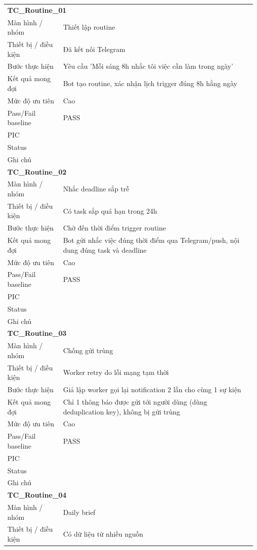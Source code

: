 \documentclass[12pt,a4paper]{article}
\begin{document}
\begin{longtable}{p{3.0cm}p{11.5cm}}
\multicolumn{2}{l}{\textbf{TC\_Routine\_01}} \\
Màn hình / nhóm & Thiết lập routine \\
Thiết bị / điều kiện & Đã kết nối Telegram \\
Bước thực hiện & Yêu cầu 'Mỗi sáng 8h nhắc tôi việc cần làm trong ngày' \\
Kết quả mong đợi & Bot tạo routine, xác nhận lịch trigger đúng 8h hằng ngày \\
Mức độ ưu tiên & Cao \\
Pass/Fail baseline & PASS \\
PIC &  \\
Status &  \\
Ghi chú &  \\
\midrule
\multicolumn{2}{l}{\textbf{TC\_Routine\_02}} \\
Màn hình / nhóm & Nhắc deadline sắp trễ \\
Thiết bị / điều kiện & Có task sắp quá hạn trong 24h \\
Bước thực hiện & Chờ đến thời điểm trigger routine \\
Kết quả mong đợi & Bot gửi nhắc việc đúng thời điểm qua Telegram/push, nội dung đúng task và deadline \\
Mức độ ưu tiên & Cao \\
Pass/Fail baseline & PASS \\
PIC &  \\
Status &  \\
Ghi chú &  \\
\midrule
\multicolumn{2}{l}{\textbf{TC\_Routine\_03}} \\
Màn hình / nhóm & Chống gửi trùng \\
Thiết bị / điều kiện & Worker retry do lỗi mạng tạm thời \\
Bước thực hiện & Giả lập worker gọi lại notification 2 lần cho cùng 1 sự kiện \\
Kết quả mong đợi & Chỉ 1 thông báo được gửi tới người dùng (dùng deduplication key), không bị gửi trùng \\
Mức độ ưu tiên & Cao \\
Pass/Fail baseline & PASS \\
PIC &  \\
Status &  \\
Ghi chú &  \\
\midrule
\multicolumn{2}{l}{\textbf{TC\_Routine\_04}} \\
Màn hình / nhóm & Daily brief \\
Thiết bị / điều kiện & Có dữ liệu từ nhiều nguồn \\

\end{longtable}
\end{document}
